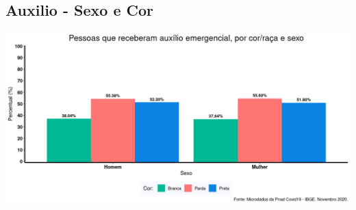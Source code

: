 \documentclass{SelfArx}
\begin{document}
\subsection*{Auxilio - Sexo e Cor}
\label{sec:orga5d48ca}
\begin{center}
\includegraphics[width=.9\linewidth]{./figs/PNAD_COVID/auxilio_cor_sexo.png}
\end{center}
\end{document}
